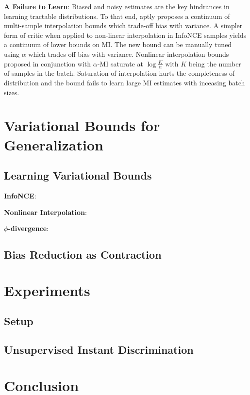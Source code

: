 \documentclass{article}
\begin{document}
\textbf{A Failure to Learn}: Biased and noisy estimates are the key hindrances in learning tractable distributions. To that end, \cite{variational} aptly proposes a continuum of multi-sample interpolation bounds which trade-off bias with variance. A simpler form of critic when applied to non-linear interpolation in InfoNCE samples yields a continuum of lower bounds on MI. The new bound can be manually tuned using $\alpha$ which trades off bias with variance. Nonlinear interpolation bounds proposed in conjunction with $\alpha$-MI saturate at $\log \frac{K}{\alpha}$ with $K$ being the number of samples in the batch. Saturation of interpolation hurts the completeness of distribution and the bound fails to learn large MI estimates with inceasing batch sizes.  


\section{Variational Bounds for Generalization}

\subsection{Learning Variational Bounds}
\textbf{InfoNCE}:

\textbf{Nonlinear Interpolation}:

\textbf{$\phi$-divergence}:

\subsection{Bias Reduction as Contraction}

\section{Experiments}
\subsection{Setup}

\subsection{Unsupervised Instant Discrimination}

\section{Conclusion}

 
\small{}

% 
\end{document}
